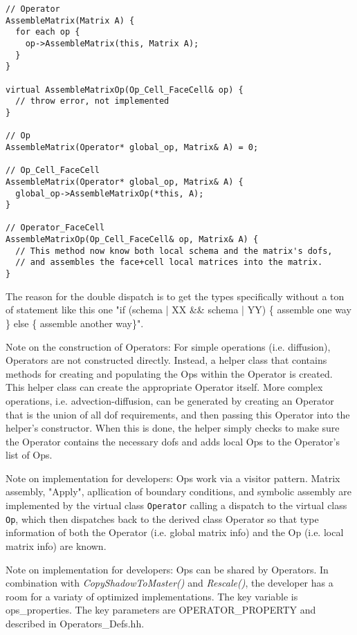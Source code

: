 \begin{verbatim}
// Operator
AssembleMatrix(Matrix A) {
  for each op {
    op->AssembleMatrix(this, Matrix A);
  }
}

virtual AssembleMatrixOp(Op_Cell_FaceCell& op) { 
  // throw error, not implemented
}

// Op
AssembleMatrix(Operator* global_op, Matrix& A) = 0;

// Op_Cell_FaceCell
AssembleMatrix(Operator* global_op, Matrix& A) {
  global_op->AssembleMatrixOp(*this, A);
}

// Operator_FaceCell
AssembleMatrixOp(Op_Cell_FaceCell& op, Matrix& A) {
  // This method now know both local schema and the matrix's dofs, 
  // and assembles the face+cell local matrices into the matrix.
}
\end{verbatim}

The reason for the double dispatch is to get the types specifically
without a ton of statement like this one "if (schema | XX \&\& schema | YY) 
\{ assemble one way \} else \{ assemble another way\}".

Note on the construction of Operators: For simple operations
(i.e. diffusion), Operators are not constructed directly.  Instead, 
a helper class that contains methods for creating and populating the
Ops within the Operator is created. This helper class can create the
appropriate Operator itself. More complex operations, i.e. 
advection-diffusion, can be generated by creating an Operator that 
is the union of all dof requirements, and then passing this Operator
into the helper's constructor. When this is done, the helper simply 
checks to make sure the Operator contains the necessary dofs and
adds local Ops to the Operator's list of Ops.

Note on implementation for developers: Ops work via a visitor pattern.
Matrix assembly, "Apply", apllication of boundary conditions, and symbolic assembly 
are implemented by the virtual class {\tt Operator} calling a dispatch to the 
virtual class {\tt Op}, which then dispatches back to the derived class Operator so that
type information of both the Operator (i.e. global matrix info) and 
the Op (i.e. local matrix info) are known.

Note on implementation for developers: Ops can be shared by
Operators. In combination with {\it CopyShadowToMaster()} and {\it Rescale()},
the developer has a room for a variaty of optimized implementations.
The key variable is ops\_properties. The key parameters are 
OPERATOR\_PROPERTY and described in Operators\_Defs.hh.





